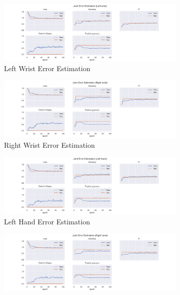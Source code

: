 \begin{figure}
  \centering
  \begin{subfigure}[b]{0.47\linewidth}
      \centering
      \includegraphics[width=\textwidth]{figures/Results/jt/JointErrorEstimation_Left wrist.png}
      \caption{Left Wrist Error Estimation}
      \label{fig:lewr_jt_ee}
  \end{subfigure}
  \hfill
  \begin{subfigure}[b]{0.47\linewidth}
      \centering
      \includegraphics[width=\textwidth]{figures/Results/jt/JointErrorEstimation_Right wrist.png}
      \caption{Right Wrist Error Estimation}
      \label{fig:riwr_jt_ee}
  \end{subfigure}
  \hfill
  \begin{subfigure}[b]{0.47\linewidth}
      \centering
      \includegraphics[width=\textwidth]{figures/Results/jt/JointErrorEstimation_Left hand.png}
      \caption{Left Hand Error Estimation}
      \label{fig:leha_jt_ee}
  \end{subfigure}
  \hfill
  \begin{subfigure}[b]{0.47\linewidth}
      \centering
      \includegraphics[width=\textwidth]{figures/Results/jt/JointErrorEstimation_Right hand.png}

\end{subfigure}
\end{figure}
